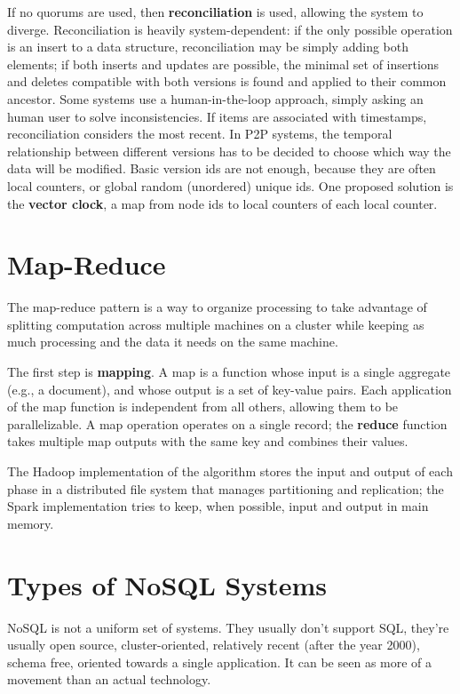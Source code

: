 If no quorums are used, then \textbf{reconciliation} is used, allowing the system to diverge. Reconciliation is heavily system-dependent: if the only possible operation is an insert to a data structure, reconciliation may be simply adding both elements; if both inserts and updates are possible, the minimal set of insertions and deletes compatible with both versions is found and applied to their common ancestor. Some systems use a human-in-the-loop approach, simply asking an human user to solve inconsistencies. If items are associated with timestamps, reconciliation considers the most recent. In P2P systems, the temporal relationship between different versions has to be decided to choose which way the data will be modified. Basic version ids are not enough, because they are often local counters, or global random (unordered) unique ids. One proposed solution is the \textbf{vector clock}, a map from node ids to local counters of each local counter.

\section{Map-Reduce}

The map-reduce pattern is a way to organize processing to take advantage of splitting computation across multiple machines on a cluster while keeping as much processing and the data it needs on the same machine.

The first step is \textbf{mapping}. A map is a function whose input is a single aggregate (e.g., a document), and whose output is a set of key-value pairs. Each application of the map function is independent from all others, allowing them to be parallelizable. A map operation operates on a single record; the \textbf{reduce} function takes multiple map outputs with the same key and combines their values.

The Hadoop implementation of the algorithm stores the input and output of each phase in a distributed file system that manages partitioning and replication; the Spark implementation tries to keep, when possible, input and output in main memory.

\section{Types of NoSQL Systems}

NoSQL is not a uniform set of systems. They usually don't support SQL, they're usually open source, cluster-oriented, relatively recent (after the year 2000), schema free, oriented towards a single application. It can be seen as more of a movement than an actual technology.

